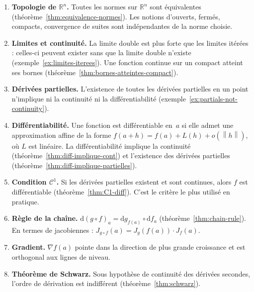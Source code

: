 \documentclass[12pt,a4paper,openany]{book}
\theoremstyle{definition}
\newcommand{\R}{\mathbb{R}}
\newcommand{\norm}[1]{\left\lVert #1 \right\rVert}
\newcommand{\dd}{\mathrm{d}}
\begin{document}
\begin{tcolorbox}[
  enhanced,
  colback=gray!5!white,
  colframe=gray!60!black,
  fonttitle=\bfseries\large,
  title={Résumé --- Chapitre \thechapter},
  breakable,
  before skip=12pt,
  after skip=12pt,
  left=10pt, right=10pt, top=8pt, bottom=8pt
]
\begin{enumerate}[label=\textbf{\arabic*.}, leftmargin=2em]
  \item \textbf{Topologie de $\R^n$.} Toutes les normes sur $\R^n$ sont équivalentes (théorème~\ref{thm:equivalence-normes}). Les notions d'ouverts, fermés, compacts, convergence de suites sont indépendantes de la norme choisie.

  \item \textbf{Limites et continuité.} La limite double est plus forte que les limites itérées : celles-ci peuvent exister sans que la limite double n'existe (exemple~\ref{ex:limites-iterees}). Une fonction continue sur un compact atteint ses bornes (théorème~\ref{thm:bornes-atteintes-compact}).

  \item \textbf{Dérivées partielles.} L'existence de toutes les dérivées partielles en un point n'implique ni la continuité ni la différentiabilité (exemple~\ref{ex:partials-not-continuity}).

  \item \textbf{Différentiabilité.} Une fonction est différentiable en~$a$ si elle admet une approximation affine de la forme $f(a+h) = f(a) + L(h) + o(\norm{h})$, où $L$ est linéaire. La différentiabilité implique la continuité (théorème~\ref{thm:diff-implique-cont}) et l'existence des dérivées partielles (théorème~\ref{thm:diff-implique-partielles}).

  \item \textbf{Condition $\mathcal{C}^1$.} Si les dérivées partielles existent et sont continues, alors $f$ est différentiable (théorème~\ref{thm:C1-diff}). C'est le critère le plus utilisé en pratique.

  \item \textbf{Règle de la chaîne.} $\dd(g \circ f)_a = \dd g_{f(a)} \circ \dd f_a$ (théorème~\ref{thm:chain-rule}). En termes de jacobiennes : $J_{g \circ f}(a) = J_g(f(a)) \cdot J_f(a)$.

  \item \textbf{Gradient.} $\nabla f(a)$ pointe dans la direction de plus grande croissance et est orthogonal aux lignes de niveau.

  \item \textbf{Théorème de Schwarz.} Sous hypothèse de continuité des dérivées secondes, l'ordre de dérivation est indifférent (théorème~\ref{thm:schwarz}).


\end{enumerate}
\end{tcolorbox}
\end{document}
